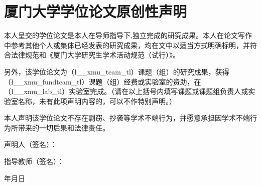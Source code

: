 \ExplSyntaxOn
\chapter*{厦门大学学位论文原创性声明}
\setcounter{page}{1}
{}
本人呈交的学位论文是本人在导师指导下,独立完成的研究成果。本人在论文写作中参考其他个人或集体已经发表的研究成果，均在文中以适当方式明确标明，并符合法律规范和《厦门大学研究生学术活动规范（试行）》。\par

另外，该学位论文为（\l__xmu_team_tl）课题（组）的研究成果，获得（\l__xmu_fundteam_tl）课题（组）经费或实验室的资助，在（\l__xmu_lab_tl）实验室完成。（请在以上括号内填写课题或课题组负责人或实验室名称，未有此项声明内容的，可以不作特别声明。）\par

本人声明该学位论文不存在剽窃、抄袭等学术不端行为，并愿意承担因学术不端行为所带来的一切后果和法律责任。\par

\vspace{5ex}
{
    \raggedleft
    声明人\quad  （签名）：\phantom{六个字的空白}\par
    指导教师（签名）：\phantom{六个字的空白}\par\vspace{5ex}

    年\qquad 月\qquad 日\phantom{这七个字的空白}\par
}

\ExplSyntaxOff